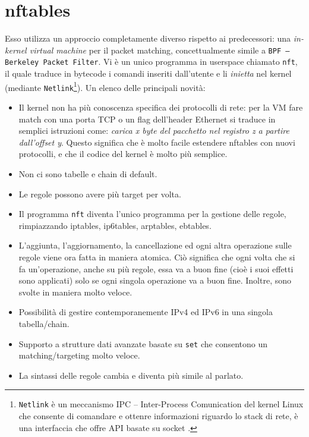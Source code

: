 \section{nftables}

Esso utilizza un approccio completamente diverso rispetto ai predecessori: una
\textit{in-kernel virtual machine} per il packet matching, concettualmente
simile a \texttt{BPF -- Berkeley Packet Filter}.
Vi è un unico programma in userspace chiamato
\texttt{nft}, il quale traduce in bytecode i comandi inseriti dall'utente e li
\textit{inietta} nel kernel (mediante \texttt{Netlink}\footnote{\texttt{Netlink}
	è un meccanismo IPC -- Inter-Process Comunication del kernel Linux che consente
	di comandare e ottenre informazioni riguardo lo stack di rete, è una interfaccia
che offre API basate su socket \cite{RFC3549}.}). Un elenco
delle principali novità:
\begin{itemize}
	\item Il kernel non ha più conoscenza specifica
	      dei protocolli di rete: per la VM fare match con una porta TCP o un flag dell'header Ethernet
	      si traduce in semplici istruzioni come: \textit{carica x byte del pacchetto nel
	      registro z a partire dall'offset y}. Questo significa che è molto facile estendere
	      nftables con nuovi protocolli, e che il codice del kernel è molto più semplice.
	\item Non ci sono tabelle e chain di default.
	\item Le regole possono avere più target per volta.
	\item Il programma \texttt{nft} diventa l'unico programma per la gestione delle regole,
	      rimpiazzando iptables, ip6tables, arptables, ebtables.
	\item L'aggiunta, l'aggiornamento, la cancellazione ed ogni altra operazione
	      sulle regole viene ora fatta in maniera atomica. Ciò significa che ogni volta che
	      si fa un'operazione, anche su più regole, essa va a buon fine (cioè i suoi effetti
		sono applicati) solo se ogni singola operazione va a buon fine. Inoltre, sono svolte
		in maniera molto veloce.
	\item Possibilità di gestire contemporanemente IPv4 ed IPv6 in una singola tabella/chain.
	\item Supporto a strutture dati avanzate basate su \texttt{set} che consentono un matching/targeting
	      molto veloce.
	\item La sintassi delle regole cambia e diventa più simile al parlato.
\end{itemize}

